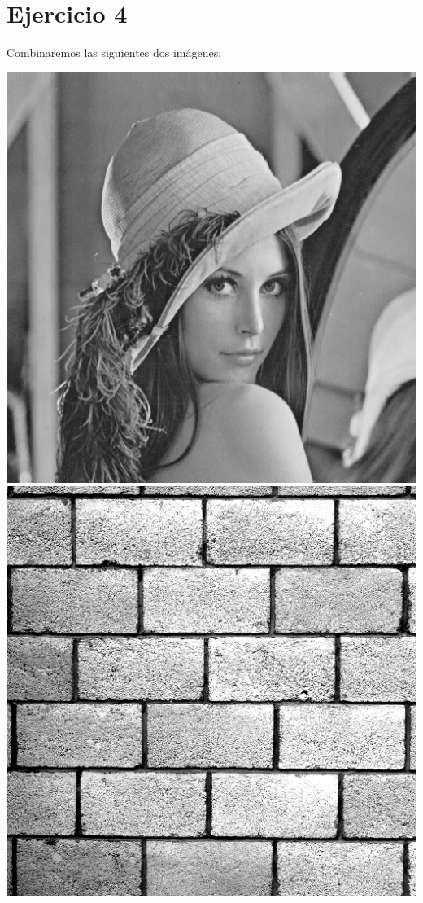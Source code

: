 \documentclass[a4paper]{article}
\begin{document}
\section{Ejercicio 4}

Combinaremos las siguientes dos imágenes:

\begin{center}

	\includegraphics[scale=0.3]{imgs/lena.png}
	\includegraphics[scale=0.3]{imgs/ladrillos.png}
\end{center}
\end{document}
